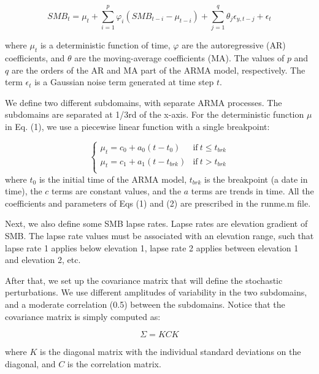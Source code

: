 \begin{equation} \label{eq1}
	\textit{SMB}_{t} = \mu_{t} + \sum_{i=1}^{p} \varphi_i \left(\textit{SMB}_{t-i}-\mu_{t-i}\right) + \sum_{j=1}^{q} \theta_{j} \epsilon_{y,t-j} + \epsilon_{t}
\end{equation}

where $\mu_{t}$ is a deterministic function of time, $\varphi$ are the autoregressive (AR) coefficients, and $\theta$ are the moving-average coefficients (MA). The values of $p$ and $q$ are the orders of the AR and MA part of the ARMA model, respectively. The term $\epsilon_{t}$ is a Gaussian noise term generated at time step $t$.

We define two different subdomains, with separate ARMA processes. The subdomains are separated at 1/3rd of the x-axis. For the deterministic function $\mu$ in Eq. (1), we use a piecewise linear function with a single breakpoint:

\begin{equation} \label{eq2}
\begin{cases}
	\mu_{t} = c_{0}+a_{0}\left(t-t_{0}\right) & \mathrm{if \:}t\leq t_{\textit{brk}}  \\
	\mu_{t} = c_{1}+a_{1}\left(t-t_{\textit{brk}}\right) & \mathrm{if \:} t>t_{\textit{brk}}  \\
\end{cases}
\end{equation}
where $t_{0}$ is the initial time of the ARMA model, $t_{brk}$ is the breakpoint (a date in time), the $c$ terms are constant values, and the $a$ terms are trends in time. All the coefficients and parameters of Eqs (1) and (2) are prescribed in the runme.m file. 

Next, we also define some SMB lapse rates. Lapse rates are elevation gradient of SMB. The lapse rate values must be associated with an elevation range, such that lapse rate 1 applies below elevation 1, lapse rate 2 applies between elevation 1 and elevation 2, etc.

After that, we set up the covariance matrix that will define the stochastic perturbations. We use different amplitudes of variability in the two subdomains, and a moderate correlation (0.5) between the subdomains. Notice that the covariance matrix is simply computed as:

\begin{equation} \label{eq3}
    \Sigma = KCK
\end{equation}

where $K$ is the diagonal matrix with the individual standard deviations on the diagonal, and $C$ is the correlation matrix.

